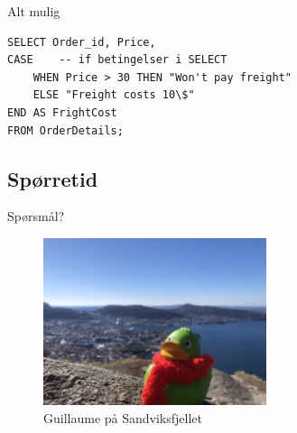 \begin{frame}[fragile]{Alt mulig}
\begin{verbatim}
SELECT Order_id, Price,
CASE    -- if betingelser i SELECT
    WHEN Price > 30 THEN "Won't pay freight"
    ELSE "Freight costs 10\$"
END AS FrightCost
FROM OrderDetails; 
\end{verbatim}
\end{frame}

\subsection*{Spørretid}
\begin{frame}{Spørsmål?}
    \begin{figure}
        \centering
        \includegraphics[height = 4.9cm]{images/guillaume1.jpg}
        \caption{Guillaume på Sandviksfjellet}
        \label{fig:guillaume1}
    \end{figure}
\end{frame}